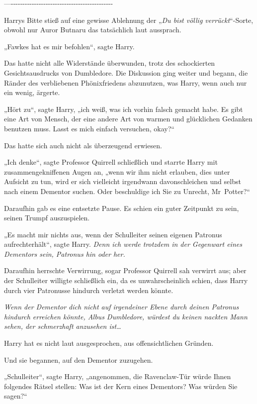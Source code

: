 {—\/-\/-\/-\/-\/-\/-\/-\/-\/-\/-\/-\/-\/-\/-\/-\/-\/-\/-\/-\/-\/-\/-\/-\/-\/-\/-\/-\/-\/-\/-\/-\/-\/-\/-\/-\/-\/-\/-\/-\/-\/-\/-\/-\/-

Harrys Bitte stieß auf eine gewisse Ablehnung der „\emph{Du bist völlig verrückt}“-Sorte, obwohl nur Auror Butnaru das tatsächlich laut aussprach.

„Fawkes hat es mir befohlen“, sagte Harry.

Das hatte nicht alle Widerstände überwunden, trotz des schockierten Gesichtsausdrucks von Dumbledore. Die Diskussion ging weiter und begann, die Ränder des verbliebenen Phönixfriedens abzunutzen, was Harry, wenn auch nur ein wenig, ärgerte.

„Hört zu“, sagte Harry, „ich weiß, was ich vorhin falsch gemacht habe. Es gibt eine Art von Mensch, der eine andere Art von warmen und glücklichen Gedanken benutzen muss. Lasst es mich einfach versuchen, okay?“

Das hatte sich auch nicht als überzeugend erwiesen.

„Ich denke“, sagte Professor Quirrell schließlich und starrte Harry mit zusammengekniffenen Augen an, „wenn wir ihm nicht erlauben, dies unter Aufsicht zu tun, wird er sich vielleicht irgendwann davonschleichen und selbst nach einem Dementor suchen. Oder beschuldige ich Sie zu Unrecht, Mr~Potter?“

Daraufhin gab es eine entsetzte Pause. Es schien ein guter Zeitpunkt zu sein, seinen Trumpf auszuspielen.

„Es macht mir nichts aus, wenn der Schulleiter seinen eigenen Patronus aufrechterhält“, sagte Harry. \emph{Denn ich werde trotzdem in der Gegenwart eines Dementors sein, Patronus hin oder her.}

Daraufhin herrschte Verwirrung, sogar Professor Quirrell sah verwirrt aus; aber der Schulleiter willigte schließlich ein, da es unwahrscheinlich schien, dass Harry durch vier Patronusse hindurch verletzt werden könnte.

\emph{Wenn der Dementor dich nicht auf irgendeiner Ebene durch deinen Patronus hindurch erreichen könnte, Albus Dumbledore, würdest du keinen nackten Mann sehen, der schmerzhaft anzusehen ist…}

Harry hat es nicht laut ausgesprochen, aus offensichtlichen Gründen.

Und sie begannen, auf den Dementor zuzugehen.

„Schulleiter“, sagte Harry, „angenommen, die Ravenclaw-Tür würde Ihnen folgendes Rätsel stellen: Was ist der Kern eines Dementors? Was würden Sie sagen?“

}

